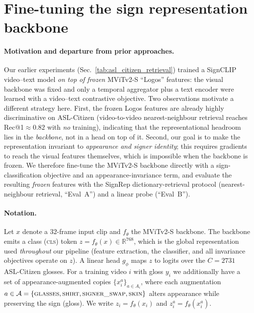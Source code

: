 
\section{Fine-tuning the sign representation backbone}
\label{sec:backbone-ft}

\paragraph{Motivation and departure from prior approaches.}
Our earlier experiments (Sec.~\ref{tab:asl_citizen_retrieval}) trained a SignCLIP
video--text model \emph{on top of frozen} MViTv2-S ``Logos'' features: the visual backbone
was fixed and only a temporal aggregator plus a text encoder were learned with a
video--text contrastive objective. Two observations motivate a different strategy here.
First, the frozen Logos features are already highly discriminative on ASL-Citizen
(video-to-video nearest-neighbour retrieval reaches Rec@1${\approx}0.82$ with \emph{no}
training), indicating that the representational headroom lies in the \emph{backbone}, not in
a head on top of it. Second, our goal is to make the representation invariant to
\emph{appearance and signer identity}; this requires gradients to reach the visual features
themselves, which is impossible when the backbone is frozen. We therefore fine-tune the
MViTv2-S backbone directly with a sign-classification objective and an appearance-invariance
term, and evaluate the resulting \emph{frozen} features with the SignRep dictionary-retrieval
protocol (nearest-neighbour retrieval, ``Eval~A'') and a linear probe (``Eval~B'').

\paragraph{Notation.}
Let $x$ denote a $32$-frame input clip and $f_\theta$ the MViTv2-S backbone. The backbone
emits a class (\textsc{cls}) token $z = f_\theta(x) \in \mathbb{R}^{768}$, which is the global
representation used \emph{throughout} our pipeline (feature extraction, the classifier, and
all invariance objectives operate on $z$). A linear head $g_\phi$ maps $z$ to logits over the
$C{=}2731$ ASL-Citizen glosses. For a training video $i$ with gloss $y_i$ we additionally have
a set of appearance-augmented copies $\{x_i^{a}\}_{a \in A_i}$, where each augmentation
$a \in \mathcal{A} = \{\textsc{glasses},\textsc{shirt},\textsc{signer\_swap},\textsc{skin}\}$
alters appearance while preserving the sign (gloss). We write $z_i = f_\theta(x_i)$ and
$z_i^{a} = f_\theta(x_i^{a})$.

